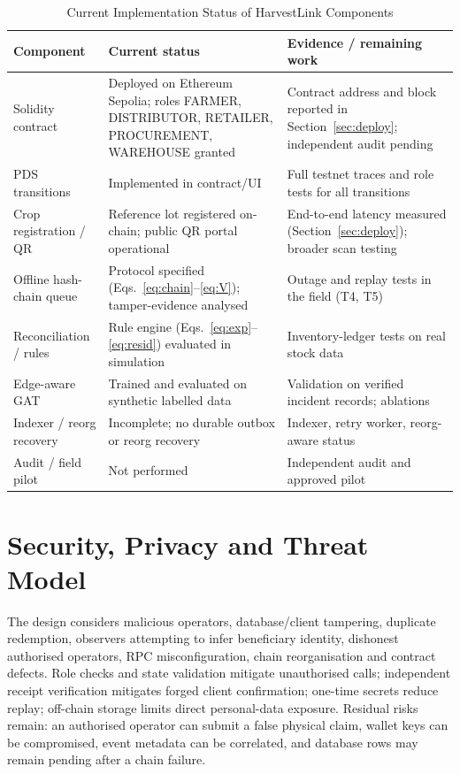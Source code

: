 \documentclass[conference,a4paper]{IEEEtran}
\begin{document}
\begin{table}[!t]
\caption{Current Implementation Status of HarvestLink Components}
\label{tab:status}
\centering\footnotesize
\renewcommand{\arraystretch}{1.1}
\begin{tabularx}{\textwidth}{@{}l X X@{}}
\toprule
Component & Current status & Evidence / remaining work\\
\midrule
Solidity contract & Deployed on Ethereum Sepolia; roles FARMER, DISTRIBUTOR, RETAILER, PROCUREMENT, WAREHOUSE granted & Contract address and block reported in Section~\ref{sec:deploy}; independent audit pending\\
PDS transitions & Implemented in contract/UI & Full testnet traces and role tests for all transitions\\
Crop registration / QR & Reference lot registered on-chain; public QR portal operational & End-to-end latency measured (Section~\ref{sec:deploy}); broader scan testing\\
Offline hash-chain queue & Protocol specified (Eqs.~\eqref{eq:chain}--\eqref{eq:V}); tamper-evidence analysed & Outage and replay tests in the field (T4, T5)\\
Reconciliation / rules & Rule engine (Eqs.~\eqref{eq:exp}--\eqref{eq:resid}) evaluated in simulation & Inventory-ledger tests on real stock data\\
Edge-aware GAT & Trained and evaluated on synthetic labelled data & Validation on verified incident records; ablations\\
Indexer / reorg recovery & Incomplete; no durable outbox or reorg recovery & Indexer, retry worker, reorg-aware status\\
Audit / field pilot & Not performed & Independent audit and approved pilot\\
\bottomrule
\end{tabularx}
\end{table}

\section{Security, Privacy and Threat Model}
The design considers malicious operators, database/client tampering, duplicate redemption, observers attempting to infer beneficiary identity, dishonest authorised operators, RPC misconfiguration, chain reorganisation and contract defects. Role checks and state validation mitigate unauthorised calls; independent receipt verification mitigates forged client confirmation; one-time secrets reduce replay; off-chain storage limits direct personal-data exposure. Residual risks remain: an authorised operator can submit a false physical claim, wallet keys can be compromised, event metadata can be correlated, and database rows may remain pending after a chain failure.
\end{document}
